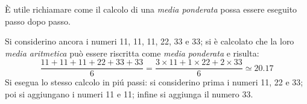 \documentclass[12pt,a4paper]{article}
\begin{document}
È utile richiamare  come il calcolo di  una \emph{media ponderata} possa essere  eseguito passo dopo
passo.

Si considerino  ancora i numeri  \num{11}, \num{11}, \num{11}, \num{22},  \num{33} e \num{33};  si è
calcolato che  la loro \emph{media  aritmetica} può essere  riscritta come \emph{media  ponderata} e
risulta:
\begin{equation*}
  \frac{\num{11} + \num{11} + \num{11} + \num{22} + \num{33} + \num{33}}{6}
  = \frac{\num{3} \times{} \num{11}
     + \num{1} \times{} \num{22}
     + \num{2} \times{} \num{33}}
  {6} \simeq \num{20,17}
\end{equation*}
Si  esegua lo  stesso calcolo  in piú  passi: si  considerino prima  i numeri  \num{11}, \num{22}  e
\num{33}; poi si aggiungano i numeri \num{11} e \num{11}; infine si aggiunga il numero \num{33}.
\end{document}
